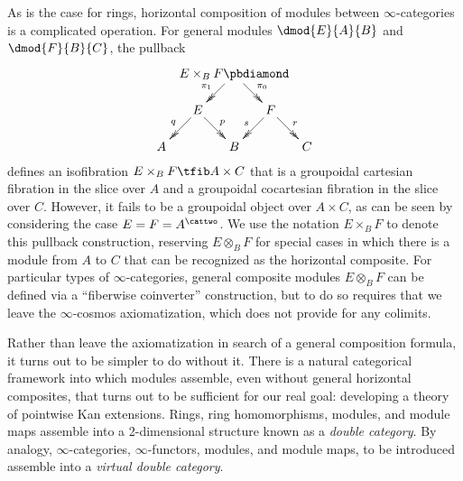 \documentclass[12pt,reqno]{amsart}
\theoremstyle{plain}
\theoremstyle{definition}
\theoremstyle{remark}
\numberwithin{equation}{subsection}
\begin{document}
As is the case for rings, horizontal composition of modules between $\infty$-categories is a complicated operation. For  general modules $\dmod{E}{A}{B}$ and $\dmod{F}{B}{C}$,  the pullback
\[ \xymatrix@!=5pt{ & & E \times_B F \pbdiamond \ar@{->>}[dl]_-{\pi_1} \ar@{->>}[dr]^-{\pi_0} \\  & E \ar@{->>}[dl]_q \ar@{->>}[dr]^p &  & F \ar@{->>}[dl]_s \ar@{->>}[dr]^r \\ A  & & B & & C}\] defines an isofibration $E \times_B F \tfib A \times C$ that is a groupoidal cartesian fibration in the slice over $A$ and a groupoidal cocartesian fibration in the slice over $C$. However, it fails to be a groupoidal object over $A \times C$, as can be seen by considering the case $E=F=A^\cattwo$. We use the notation $E \times_B F$ to denote this pullback construction, reserving $E \otimes_B F$ for special cases in which there is a module from $A$ to $C$ that can be recognized as the horizontal composite. For particular types of $\infty$-categories, general composite modules  $E \otimes_B F$  can be defined via a ``fiberwise coinverter'' construction, but to do so requires that we leave the $\infty$-cosmos axiomatization, which does not provide for any colimits.

Rather than leave the axiomatization in search of a general composition formula, it turns out to be simpler to do without it. There is a natural categorical framework into which modules assemble, even without general horizontal composites, that turns out to be sufficient for our real goal: developing a theory of pointwise Kan extensions. Rings, ring homomorphisms, modules, and module maps assemble into a 2-dimensional structure known as a \emph{double category}. By analogy, $\infty$-categories, $\infty$-functors, modules, and module maps, to be introduced assemble into a \emph{virtual double category}.
\end{document}
